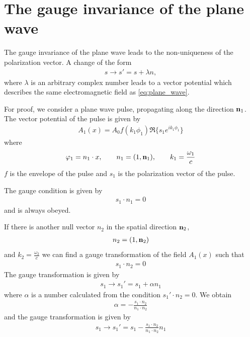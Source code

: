 \section{The gauge invariance of the plane wave}

The gauge invariance of the plane wave leads to the non-uniqueness of the polarization vector. A change of the form
\begin{align}
    s \rightarrow s' = s + \lambda n,
\end{align}
where $\lambda$ is an arbitrary complex number leads to a vector potential which describes the same electromagnetic field as \eqref{eq:plane_wave}.





For proof, we consider a plane wave pulse, propagating along the direction ${\bf n}_1$. The vector potential of the pulse is given by
\begin{align}
    A_1(x) = A_0 f(k_1\phi_1)\Re\{s_1 e^{i k_1\phi_1}\}
\end{align}
where
\begin{align}
    \varphi_1 = n_1\cdot x, \qquad n_1 = (1,{\bf n}_1), \qquad k_1 = \frac{\omega_1}{c}
\end{align}
$f$ is the envelope of the pulse and $s_1$ is the polarization vector of the pulse.

The gauge condition is given by
\begin{align}
    s_1\cdot n_1=0
\end{align}
and is always obeyed.

If there is another null vector $n_2$ in the spatial direction ${\bf n}_2$,
\begin{align}
    n_2 = (1,{\bf n}_2)
\end{align}
and $k_2= \frac{\omega_2}{c}$ we can find a gauge transformation of the field $A_1(x)$ such that
\begin{align}
    s_1\cdot n_2=0
\end{align}
The gauge transformation is given by
\begin{align}
    s_1\rightarrow s_1' = s_1 + \alpha n_1
\end{align}
where $\alpha$ is a number calculated from the condition $s_1'\cdot n_2=0$.
We obtain
\begin{align}
    \alpha = - \frac{s_1\cdot n_2}{n_1\cdot n_2}
\end{align}
and the gauge transformation is given by
\begin{align}
    s_1\rightarrow s_1' = s_1 - \frac{s_1\cdot n_2}{n_1\cdot n_2} n_1
\end{align}
